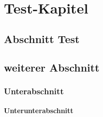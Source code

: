 \chapter{Test-Kapitel}

	\section{Abschnitt Test}
		\blindtext
	\section{weiterer Abschnitt}
		\blindtext
		\subsection{Unterabschnitt}
			\subsubsection{Unterunterabschnitt}
			
